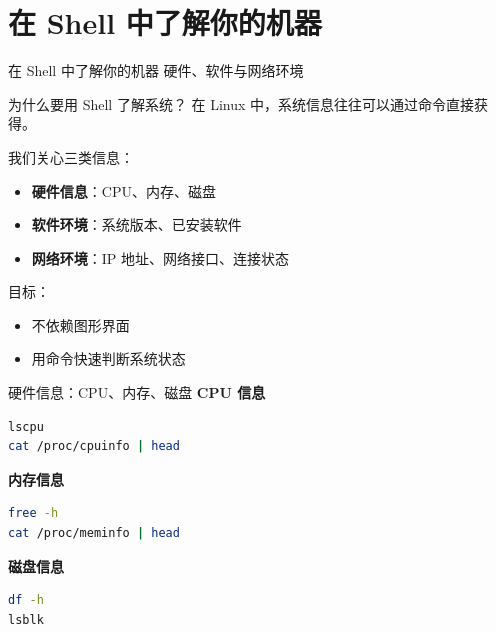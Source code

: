 \documentclass[aspectratio=169]{beamer}
\begin{document}
\section{在 Shell 中了解你的机器}

\begin{frame}{在 Shell 中了解你的机器}
\centering
\Large
硬件、软件与网络环境
\end{frame}

\begin{frame}{为什么要用 Shell 了解系统？}
在 Linux 中，系统信息往往可以通过命令直接获得。

\vspace{0.5em}
我们关心三类信息：
\begin{itemize}
  \item \textbf{硬件信息}：CPU、内存、磁盘
  \item \textbf{软件环境}：系统版本、已安装软件
  \item \textbf{网络环境}：IP 地址、网络接口、连接状态
\end{itemize}

\vspace{0.8em}
目标：
\begin{itemize}
  \item 不依赖图形界面
  \item 用命令快速判断系统状态
\end{itemize}
\end{frame}


\begin{frame}[fragile]{硬件信息：CPU、内存、磁盘}
\textbf{CPU 信息}
\begin{lstlisting}[language=bash]
lscpu
cat /proc/cpuinfo | head
\end{lstlisting}

\textbf{内存信息}
\begin{lstlisting}[language=bash]
free -h
cat /proc/meminfo | head
\end{lstlisting}

\textbf{磁盘信息}
\begin{lstlisting}[language=bash]
df -h
lsblk
\end{lstlisting}
\end{frame}
\end{document}
